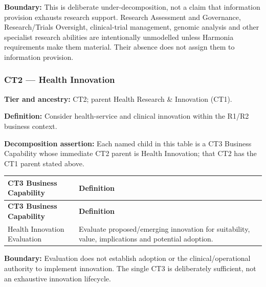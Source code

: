 \textbf{Boundary:} This is deliberate under-decomposition, not a claim that information provision exhausts research support. Research Assessment and Governance, Research/\allowbreak{}Trials Oversight, clinical-trial management, genomic analysis and other specialist research abilities are intentionally unmodelled unless Harmonia requirements make them material. Their absence does not assign them to information provision.

\label{rad:business:846}
\subsubsection*{CT2 — Health Innovation}
\label{rad:business:848}

\textbf{Tier and ancestry:} CT2; parent Health Research \& Innovation (CT1).

\label{rad:business:850}

\textbf{Definition:} Consider health-service and clinical innovation within the R1/\allowbreak{}R2 business context.

\label{rad:business:852}

\textbf{Decomposition assertion:} Each named child in this table is a CT3 Business Capability whose immediate CT2 parent is Health Innovation; that CT2 has the CT1 parent stated above.

\label{rad:business:854}
\begingroup\small\setlength{\TableWidth}{\dimexpr\linewidth-4\tabcolsep-3\arrayrulewidth\relax}
\begin{longtable}{|>{\raggedright\arraybackslash}p{0.35\TableWidth}|>{\raggedright\arraybackslash}p{0.65\TableWidth}|}
\hline\rowcolor{TableHead}\textbf{CT3 Business Capability} & \textbf{Definition}\\\hline\endfirsthead
\hline\rowcolor{TableHead}\textbf{CT3 Business Capability} & \textbf{Definition}\\\hline\endhead
\hline\endfoot
Health Innovation Evaluation & Evaluate proposed/\allowbreak{}emerging innovation for suitability, value, implications and potential adoption.\\\hline
\end{longtable}\endgroup
{}\label{rad:business:858}

\textbf{Boundary:} Evaluation does not establish adoption or the clinical/\allowbreak{}operational authority to implement innovation. The single CT3 is deliberately sufficient, not an exhaustive innovation lifecycle.

